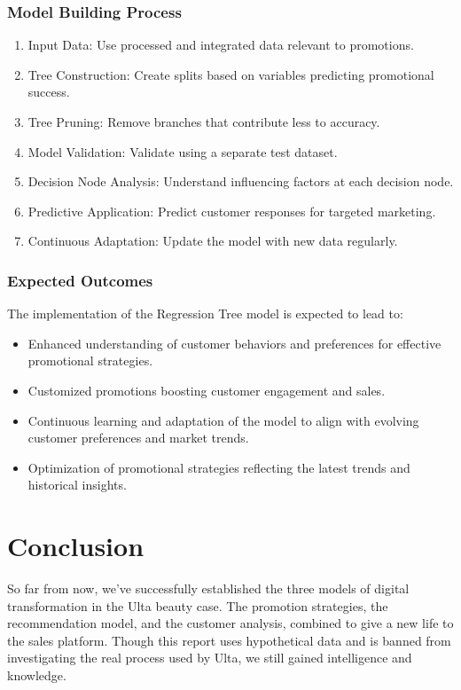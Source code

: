 \documentclass{article}
\begin{document}
\subsubsection{Model Building Process}
\label{sec:model_building}
\begin{enumerate}
    \item Input Data: Use processed and integrated data relevant to promotions.
    \item Tree Construction: Create splits based on variables predicting promotional success.
    \item Tree Pruning: Remove branches that contribute less to accuracy.
    \item Model Validation: Validate using a separate test dataset.
    \item Decision Node Analysis: Understand influencing factors at each decision node.
    \item Predictive Application: Predict customer responses for targeted marketing.
    \item Continuous Adaptation: Update the model with new data regularly.
\end{enumerate}

\subsubsection{Expected Outcomes}
\label{sec:expected_outcomes}
The implementation of the Regression Tree model is expected to lead to:
\begin{itemize}
    \item Enhanced understanding of customer behaviors and preferences for effective promotional strategies.
    \item Customized promotions boosting customer engagement and sales.
    \item Continuous learning and adaptation of the model to align with evolving customer preferences and market trends.
    \item Optimization of promotional strategies reflecting the latest trends and historical insights.
\end{itemize}

\section{Conclusion}
So far from now, we've successfully established the three models of digital transformation in the Ulta beauty case. The promotion strategies, the recommendation model, and the customer analysis, combined to give a new life to the sales platform. Though this report uses hypothetical data and is banned from investigating the real process used by Ulta, we still gained intelligence and knowledge.


\cite{ultabeauty2021}
\end{document}
